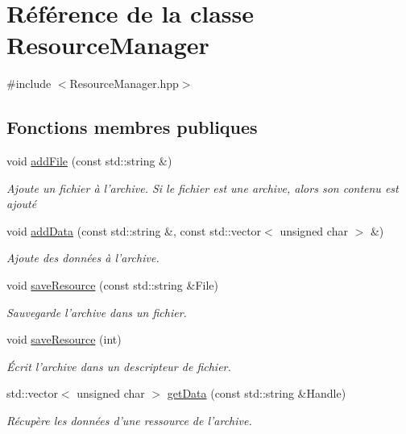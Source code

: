 \hypertarget{classResourceManager}{\section{Référence de la classe Resource\+Manager}
\label{classResourceManager}
}


{\ttfamily \#include $<$Resource\+Manager.\+hpp$>$}

\subsection*{Fonctions membres publiques}
\begin{DoxyCompactItemize}
\item 
void \hyperlink{classResourceManager_aa812c98a716dfa62c2bc3f71b4e20e98}{add\+File} (const std\+::string \&)
\begin{DoxyCompactList}\small\item\em Ajoute un fichier à l'archive. Si le fichier est une archive, alors son contenu est ajouté \end{DoxyCompactList}\item 
void \hyperlink{classResourceManager_a10f59a5ddf5a7dbdd203240386630797}{add\+Data} (const std\+::string \&, const std\+::vector$<$ unsigned char $>$ \&)
\begin{DoxyCompactList}\small\item\em Ajoute des données à l'archive. \end{DoxyCompactList}\item 
void \hyperlink{classResourceManager_ac534a350e6fbba1ef293e86aaed47bc2}{save\+Resource} (const std\+::string \&File)
\begin{DoxyCompactList}\small\item\em Sauvegarde l'archive dans un fichier. \end{DoxyCompactList}\item 
void \hyperlink{classResourceManager_aa5879e275263e1dc3750cac2005e314e}{save\+Resource} (int)
\begin{DoxyCompactList}\small\item\em Écrit l'archive dans un descripteur de fichier. \end{DoxyCompactList}\item 
std\+::vector$<$ unsigned char $>$ \hyperlink{classResourceManager_aba892a2f43fd3cfe0a757b8477ea7ca3}{get\+Data} (const std\+::string \&Handle)
\begin{DoxyCompactList}\small\item\em Récupère les données d'une ressource de l'archive. \end{DoxyCompactList}\item 

\end{DoxyCompactItemize}
